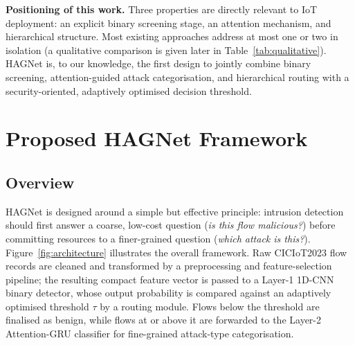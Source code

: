 \documentclass{llncs}
\begin{document}
\textbf{Positioning of this work.} Three properties are directly relevant to IoT deployment: an explicit binary screening stage, an attention mechanism, and hierarchical structure. Most existing approaches address at most one or two in isolation (a qualitative comparison is given later in Table~\ref{tab:qualitative}). HAGNet is, to our knowledge, the first design to jointly combine binary screening, attention-guided attack categorisation, and hierarchical routing with a security-oriented, adaptively optimised decision threshold.

\section{Proposed HAGNet Framework}
\label{sec:methodology}

\subsection{Overview}

HAGNet is designed around a simple but effective principle: intrusion detection should first answer a coarse, low-cost question (\emph{is this flow malicious?}) before committing resources to a finer-grained question (\emph{which attack is this?}). Figure~\ref{fig:architecture} illustrates the overall framework. Raw CICIoT2023 flow records are cleaned and transformed by a preprocessing and feature-selection pipeline; the resulting compact feature vector is passed to a Layer-1 1D-CNN binary detector, whose output probability is compared against an adaptively optimised threshold $\tau$ by a routing module. Flows below the threshold are finalised as benign, while flows at or above it are forwarded to the Layer-2 Attention-GRU classifier for fine-grained attack-type categorisation.
\end{document}
